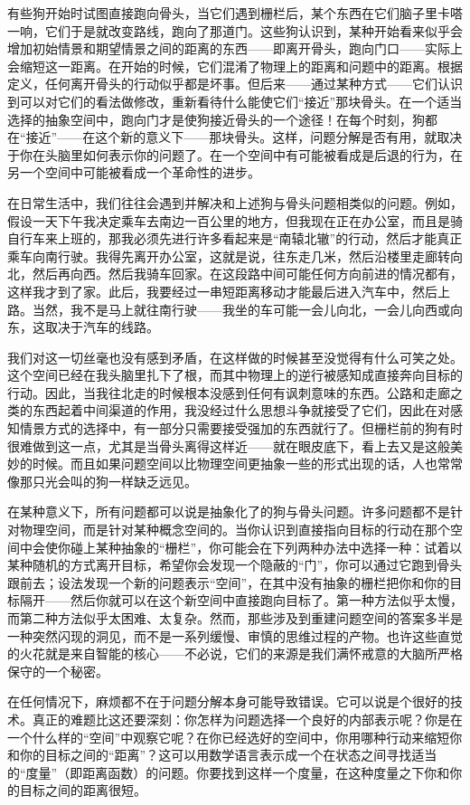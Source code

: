 有些狗开始时试图直接跑向骨头，当它们遇到栅栏后，某个东西在它们脑子里卡嗒一响，它们于是就改变路线，跑向了那道门。这些狗认识到，某种开始看来似乎会增加初始情景和期望情景之间的距离的东西——即离开骨头，跑向门口——实际上会缩短这一距离。在开始的时候，它们混淆了物理上的距离和问题中的距离。根据定义，任何离开骨头的行动似乎都是坏事。但后来——通过某种方式——它们认识到可以对它们的看法做修改，重新看待什么能使它们“接近”那块骨头。在一个适当选择的抽象空间中，跑向门才是使狗接近骨头的一个途径！在每个时刻，狗都在“接近”——在这个新的意义下——那块骨头。这样，问题分解是否有用，就取决于你在头脑里如何表示你的问题了。在一个空间中有可能被看成是后退的行为，在另一个空间中可能被看成一个革命性的进步。

在日常生活中，我们往往会遇到并解决和上述狗与骨头问题相类似的问题。例如，假设一天下午我决定乘车去南边一百公里的地方，但我现在正在办公室，而且是骑自行车来上班的，那我必须先进行许多看起来是“南辕北辙”的行动，然后才能真正乘车向南行驶。我得先离开办公室，这就是说，往东走几米，然后沿楼里走廊转向北，然后再向西。然后我骑车回家。在这段路中间可能任何方向前进的情况都有，这样我才到了家。此后，我要经过一串短距离移动才能最后进入汽车中，然后上路。当然，我不是马上就往南行驶——我坐的车可能一会儿向北，一会儿向西或向东，这取决于汽车的线路。

我们对这一切丝毫也没有感到矛盾，在这样做的时候甚至没觉得有什么可笑之处。这个空间已经在我头脑里扎下了根，而其中物理上的逆行被感知成直接奔向目标的行动。因此，当我往北走的时候根本没感到任何有讽刺意味的东西。公路和走廊之类的东西起着中间渠道的作用，我没经过什么思想斗争就接受了它们，因此在对感知情景方式的选择中，有一部分只需要接受强加的东西就行了。但栅栏前的狗有时很难做到这一点，尤其是当骨头离得这样近——就在眼皮底下，看上去又是这般美妙的时候。而且如果问题空间以比物理空间更抽象一些的形式出现的话，人也常常像那只光会叫的狗一样缺乏远见。

在某种意义下，所有问题都可以说是抽象化了的狗与骨头问题。许多问题都不是针对物理空间，而是针对某种概念空间的。当你认识到直接指向目标的行动在那个空间中会使你碰上某种抽象的“栅栏”，你可能会在下列两种办法中选择一种：试着以某种随机的方式离开目标，希望你会发现一个隐蔽的“门”，你可以通过它跑到骨头跟前去；设法发现一个新的问题表示“空间”，在其中没有抽象的栅栏把你和你的目标隔开——然后你就可以在这个新空间中直接跑向目标了。第一种方法似乎太慢，而第二种方法似乎太困难、太复杂。然而，那些涉及到重建问题空间的答案多半是一种突然闪现的洞见，而不是一系列缓慢、审慎的思维过程的产物。也许这些直觉的火花就是来自智能的核心——不必说，它们的来源是我们满怀戒意的大脑所严格保守的一个秘密。

在任何情况下，麻烦都不在于问题分解本身可能导致错误。它可以说是个很好的技术。真正的难题比这还要深刻：你怎样为问题选择一个良好的内部表示呢？你是在一个什么样的“空间”中观察它呢？在你已经选好的空间中，你用哪种行动来缩短你和你的目标之间的“距离”？这可以用数学语言表示成一个在状态之间寻找适当的“度量”（即距离函数）的问题。你要找到这样一个度量，在这种度量之下你和你的目标之间的距离很短。

